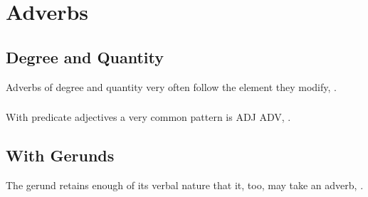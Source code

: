 %
%

\section{Adverbs}

\subsection{Degree and Quantity} Adverbs of degree and quantity very
often follow the element they modify,  .

\subsubsection{} With predicate adjectives a very common pattern is
ADJ  ADV,  .

\subsection{With Gerunds} The gerund retains enough of its verbal
nature that it, too, may take an adverb,  .  \label{syn:adverbs:gerund}

